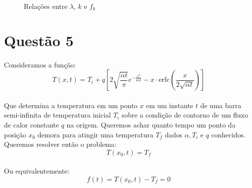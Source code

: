 \documentclass[a4paper,11pt]{article}
\begin{document}
	\begin{figure}[!htp]
	\centering
	
	\caption{}
	\label{graph:4-3}
	\end{figure}
	 \FloatBarrier	
	\FloatBarrier	
\begin{figure}
	\hspace{-4.0 cm}
	\begin{subfigure}[!htp]{0.5\textwidth}
	
	\caption{}
	\label{graph:4-1}
	\end{subfigure}
%
	\hspace{4.0 cm}
%
	\begin{subfigure}[!htp]{0.5\textwidth}
	
	\caption{}
	\label{graph:4-2}
	\end{subfigure}
	\caption{Relações entre $\lambda$, $k$ e $f_k$}
\end{figure}
\FloatBarrier

\section*{Questão 5}
\paragraph{}Consideramos a função:
\begin{equation}
	T(x,t) = T_i + q \left[ 2\sqrt{\frac{\alpha t}{\pi}} e^{-\frac{x^2}{4 \alpha t}} - x \cdot \mbox{erfc}(\frac{x}{2 \sqrt{\alpha t}})\right] 
	\label{eq:T(x,t)}
\end{equation}

\paragraph{}Que determina a temperatura em um ponto $x$ em um instante $t$ de uma barra semi-infinita de temperatura inicial $T_i$ sobre a condição de contorno de um fluxo de calor constante $q$ na origem. Queremos achar quanto tempo um ponto da posição $x_0$ demora para atingir uma temperatura $T_f$ dados $\alpha, T_i$ e $q$ conhecidos. Queremos resolver então o problema:
\begin{displaymath}
	 T(x_0, t) = T_f 
\end{displaymath}
\paragraph{}Ou equivalentemente:
\begin{equation}
	 f(t) = T(x_0, t) - T_f = 0 
	 \label{eq:f(t)}
\end{equation}
\end{document}
